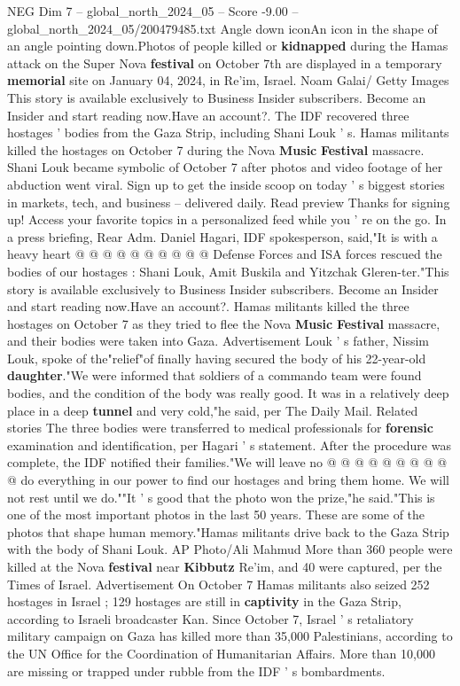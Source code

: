 \begin{textsample}{NEG Dim 7 – global\_north\_2024\_05 – Score -9.00 – global\_north\_2024\_05/200479485.txt}  \label{ex:f7_neg_187}
Angle down iconAn icon in the shape of an angle pointing down.Photos of people killed or \textbf{kidnapped} during the Hamas attack on the Super Nova \textbf{festival} on October 7th are displayed in a temporary \textbf{memorial} site on January 04, 2024, in Re'im, Israel.
Noam Galai/ Getty Images This story is available exclusively to Business Insider subscribers.
Become an Insider and start reading now.Have an account?.
The IDF recovered three hostages ' bodies from the Gaza Strip, including Shani Louk ' s.
Hamas militants killed the hostages on October 7 during the Nova \textbf{Music} \textbf{Festival} massacre.
Shani Louk became symbolic of October 7 after photos and video footage of her abduction went viral.
Sign up to get the inside scoop on today ' s biggest stories in markets, tech, and business -- delivered daily.
Read preview Thanks for signing up!
Access your favorite topics in a personalized feed while you ' re on the go.
In a press briefing, Rear Adm.
Daniel Hagari, IDF spokesperson, said,"It is with a heavy heart @ @ @ @ @ @ @ @ @ @ Defense Forces and ISA forces rescued the bodies of our hostages : Shani Louk, Amit Buskila and Yitzchak Gleren-ter."This story is available exclusively to Business Insider subscribers.
Become an Insider and start reading now.Have an account?.
Hamas militants killed the three hostages on October 7 as they tried to flee the Nova \textbf{Music} \textbf{Festival} massacre, and their bodies were taken into Gaza.
Advertisement Louk ' s father, Nissim Louk, spoke of the"relief"of finally having secured the body of his 22-year-old \textbf{daughter}."We were informed that soldiers of a commando team were found bodies, and the condition of the body was really good.
It was in a relatively deep place in a deep \textbf{tunnel} and very cold,"he said, per The Daily Mail.
Related stories The three bodies were transferred to medical professionals for \textbf{forensic} examination and identification, per Hagari ' s statement.
After the procedure was complete, the IDF notified their families."We will leave no @ @ @ @ @ @ @ @ @ @ do everything in our power to find our hostages and bring them home.
We will not rest until we do.""It ' s good that the photo won the prize,"he said."This is one of the most important photos in the last 50 years.
These are some of the photos that shape human memory."Hamas militants drive back to the Gaza Strip with the body of Shani Louk.
AP Photo/Ali Mahmud More than 360 people were killed at the Nova \textbf{festival} near \textbf{Kibbutz} Re'im, and 40 were captured, per the Times of Israel.
Advertisement On October 7 Hamas militants also seized 252 hostages in Israel ; 129 hostages are still in \textbf{captivity} in the Gaza Strip, according to Israeli broadcaster Kan.
Since October 7, Israel ' s retaliatory military campaign on Gaza has killed more than 35,000 Palestinians, according to the UN Office for the Coordination of Humanitarian Affairs.
More than 10,000 are missing or trapped under rubble from the IDF ' s bombardments.

\end{textsample}
